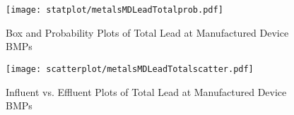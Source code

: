         \begin{figure}[hb]   %
            \centering
            \texttt{[image: statplot/metalsMDLeadTotalprob.pdf]}
            \caption{Box and Probability Plots of Total Lead at Manufactured Device BMPs}
        \end{figure}         %
        
        
        \begin{figure}[hb]   %
            \centering
            \texttt{[image: scatterplot/metalsMDLeadTotalscatter.pdf]}
            \caption{Influent vs. Effluent Plots of Total Lead at Manufactured Device BMPs}
        \end{figure}         %
        \clearpage
        